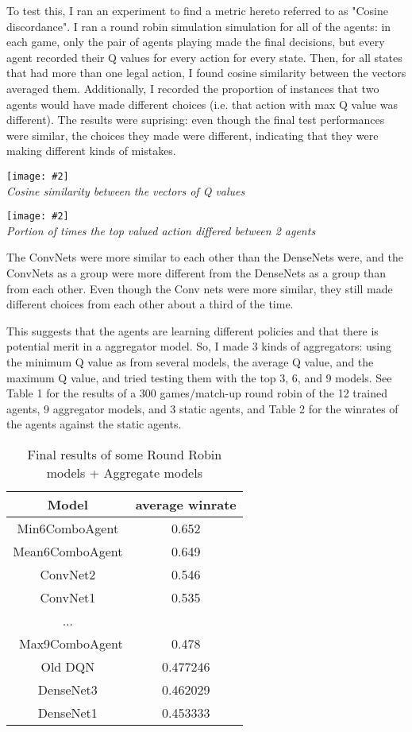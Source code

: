 \documentclass{article}
\newcommand{\pic}[3]{
\begin{center}
\texttt{[image: \#2]}\\
\small\textit{#3}
\end{center}
}
\newcommand{\beginTable}[2]{
\begin{table}[t]
\caption{#1}
\vskip 0.15in
\begin{center}
\begin{small}
\begin{sc}
\begin{tabular}{#2}
\toprule
}
\newcommand{\finTable}{
\bottomrule
\end{tabular}
\end{sc}
\end{small}
\end{center}
\vskip -0.1in
\end{table}
}
\begin{document}
To test this, I ran an experiment to find a metric hereto referred to as "Cosine discordance". I ran a round robin simulation simulation for all of the agents: in each game, only the pair of agents playing made the final decisions, but every agent recorded their Q values for every action for every state. Then, for all states that had more than one legal action, I found cosine similarity between the vectors averaged them. Additionally, I recorded the proportion of instances that two agents would have made different choices (i.e. that action with max Q value was different). The results were suprising: even though the final test performances were similar, the choices they made were different, indicating that they were making different kinds of mistakes.

\pic{.4}{Cosine_Discordance.png}{Cosine similarity between the vectors of Q values}

\pic{0.4}{Made_Different_Choices.png}{Portion of times the top valued action differed between 2 agents}

The ConvNets were more similar to each other than the DenseNets were, and the ConvNets as a group were more different from the DenseNets as a group than from each other. Even though the Conv nets were more similar, they still made different choices from each other about a third of the time.

This suggests that the agents are learning different policies and that there is potential merit in a aggregator model. So, I made 3 kinds of aggregators: using the minimum Q value as from several models, the average Q value, and the maximum Q value, and tried testing them with the top 3, 6, and 9 models. See Table 1 for the results of a 300 games/match-up round robin of the 12 trained agents, 9 aggregator models, and 3 static agents, and Table 2 for the winrates of the agents against the static agents.

\beginTable{Final results of some Round Robin models + Aggregate models}{cc}
Model & average winrate \\
\midrule
Min6ComboAgent & 0.652\\
Mean6ComboAgent & 0.649\\
ConvNet2 & 0.546\\
ConvNet1 & 0.535\\
...\\\
Max9ComboAgent & 0.478\\
Old DQN & 0.477246\\
DenseNet3 & 0.462029\\
DenseNet1 & 0.453333\\
\finTable
\end{document}
